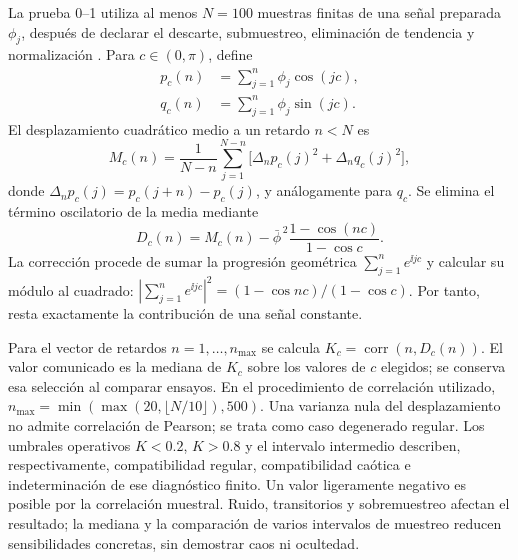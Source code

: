 La prueba 0--1 utiliza al menos $N=100$ muestras finitas de una señal
preparada $\phi_j$, después de
declarar el descarte, submuestreo, eliminación de tendencia y
normalización \cite{gottwald2009}. Para $c\in(0,\pi)$, define
\begin{align}
 p_c(n)&=\sum_{j=1}^n\phi_j\cos(jc),\nonumber\\
 q_c(n)&=\sum_{j=1}^n\phi_j\sin(jc).
 \label{bre:diag:translations}
\end{align}
El desplazamiento cuadrático medio a un retardo $n<N$ es
\begin{equation}
 M_c(n)=\frac1{N-n}\sum_{j=1}^{N-n}
 \bigl[\Delta_np_c(j)^2+\Delta_nq_c(j)^2\bigr],
 \label{bre:diag:msd}
\end{equation}
donde $\Delta_np_c(j)=p_c(j+n)-p_c(j)$, y análogamente para $q_c$.
Se elimina el término oscilatorio de la media mediante
\begin{equation}
 D_c(n)=M_c(n)-\bar\phi^{\,2}
                 \frac{1-\cos(nc)}{1-\cos c}.
 \label{bre:diag:modified-msd}
\end{equation}
La corrección procede de sumar la progresión geométrica
$\sum_{j=1}^n e^{\ii jc}$ y calcular su módulo al cuadrado:
$|\sum_{j=1}^n e^{\ii jc}|^2=(1-\cos nc)/(1-\cos c)$.
Por tanto, resta exactamente la contribución de una señal constante.

Para el vector de retardos $n=1,\ldots,n_{\max}$ se calcula
$K_c=\operatorname{corr}(n,D_c(n))$. El valor comunicado es la mediana
de $K_c$ sobre los valores de $c$ elegidos; se conserva esa selección al
comparar ensayos. En el procedimiento de correlación utilizado,
$n_{\max}=\min(\max(20,\lfloor N/10\rfloor),500)$.
Una varianza nula del desplazamiento no admite correlación de Pearson;
se trata como caso degenerado regular. Los umbrales operativos
$K<0.2$, $K>0.8$ y el intervalo intermedio describen, respectivamente,
compatibilidad regular, compatibilidad caótica e indeterminación de ese
diagnóstico finito. Un valor ligeramente negativo es posible por la
correlación muestral. Ruido, transitorios y sobremuestreo afectan el
resultado; la mediana y la comparación de varios intervalos de muestreo
reducen sensibilidades concretas, sin demostrar caos ni ocultedad.
